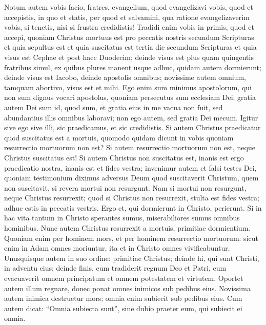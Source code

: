 \begin{biblechapter} 
\verse Notum autem vobis facio, fratres, evangelium, quod evangelizavi vobis, quod et accepistis, in quo et statis, 
\verse per quod et salvamini, qua ratione evangelizaverim vobis, si tenetis, nisi si frustra credidistis! 
\verse Tradidi enim vobis in primis, quod et accepi, quoniam Christus mortuus est pro peccatis nostris secundum Scripturas 
\verse et quia sepultus est et quia suscitatus est tertia die secundum Scripturas 
\verse et quia visus est Cephae et post haec Duodecim; 
\verse deinde visus est plus quam quingentis fratribus simul, ex quibus plures manent usque adhuc, quidam autem dormierunt; 
\verse deinde visus est Iacobo, deinde apostolis omnibus; 
\verse novissime autem omnium, tamquam abortivo, visus est et mihi. 
\verse Ego enim sum minimus apostolorum, qui non sum dignus vocari apostolus, quoniam persecutus sum ecclesiam Dei; 
\verse gratia autem Dei sum id, quod sum, et gratia eius in me vacua non fuit, sed abundantius illis omnibus laboravi; non ego autem, sed gratia Dei mecum. 
\verse Igitur sive ego sive illi, sic praedicamus, et sic credidistis. 
\verse Si autem Christus praedicatur quod suscitatus est a mortuis, quomodo quidam dicunt in vobis quoniam resurrectio mortuorum non est? 
\verse Si autem resurrectio mortuorum non est, neque Christus suscitatus est! 
\verse Si autem Christus non suscitatus est, inanis est ergo praedicatio nostra, inanis est et fides vestra; 
\verse invenimur autem et falsi testes Dei, quoniam testimonium diximus adversus Deum quod suscitaverit Christum, quem non suscitavit, si revera mortui non resurgunt. 
\verse Nam si mortui non resurgunt, neque Christus resurrexit; 
\verse quod si Christus non resurrexit, stulta est fides vestra; adhuc estis in peccatis vestris. 
\verse Ergo et, qui dormierunt in Christo, perierunt. 
\verse Si in hac vita tantum in Christo sperantes sumus, miserabiliores sumus omnibus hominibus. 
\verse Nunc autem Christus resurrexit a mortuis, primitiae dormientium. 
\verse Quoniam enim per hominem mors, et per hominem resurrectio mortuorum: 
\verse sicut enim in Adam omnes moriuntur, ita et in Christo omnes vivificabuntur.  
\verse Unusquisque autem in suo ordine: primitiae Christus; deinde hi, qui sunt Christi, in adventu eius; 
\verse deinde finis, cum tradiderit regnum Deo et Patri, cum evacuaverit omnem principatum et omnem potestatem et virtutem. 
\verse Oportet autem illum regnare, donec ponat omnes inimicos sub pedibus eius. 
\verse Novissima autem inimica destruetur mors; 
\verse omnia enim subiecit sub pedibus eius. Cum autem dicat: “Omnia subiecta sunt”, sine dubio praeter eum, qui subiecit ei omnia. 

\end{biblechapter}
